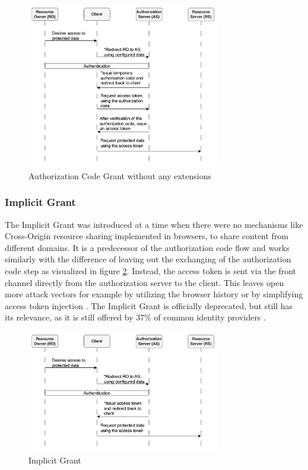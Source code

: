 \documentclass[
    fontsize=12pt,
    headings=small,
    parskip=half,           %
    bibliography=totoc,
    numbers=noenddot,       %
    open=any,               %
    ]{scrreprt}
\begin{document}
\begin{figure}[ht]
	\sffamily\footnotesize
	\includegraphics[width=0.75\textwidth]{pic/authorization_code_grant.png}
	\unitlength=0.75mm
	\linethickness{0.4pt}
	\caption{Authorization Code Grant without any extensions}
	\label{fig:auth_code_grant}
\end{figure}

\subsubsection{Implicit Grant}
The Implicit Grant was introduced at a time when there were no mechanisms like Cross-Origin resource sharing implemented in browsers, to share content from different domains. It is a predecessor of the authorization code flow and works similarly with the difference of leaving out the exchanging of the
authorization code step as visualized in figure \ref{fig:implicit_grant}. Instead, the access token is sent via the front
channel directly from the authorization server to the client. This leaves open more attack vectors for example by utilizing the browser history or by
simplifying access token injection \cite{lodderstedt2020oauth}. The Implicit
Grant is officially deprecated, but still has its relevance, as it is still
offered by 37\% of common identity providers \cite{philippaerts2022oauch}.

\begin{figure}[ht]
	\sffamily\footnotesize
	\includegraphics[width=0.75\textwidth]{pic/implicit_grant.png}
	\unitlength=0.75mm
	\linethickness{0.4pt}
	\caption{Implicit Grant}
	\label{fig:implicit_grant}
\end{figure}
\end{document}
